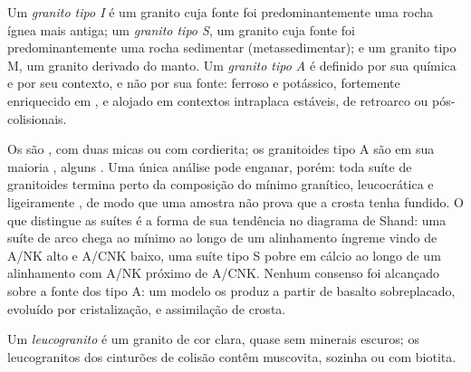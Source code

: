 \begin{definition}\label{def:b2:crustal-melting:types}
Um \emph{granito tipo I} é um granito cuja fonte foi predominantemente uma
rocha ígnea mais antiga; um \emph{granito tipo S}, um granito cuja fonte foi
predominantemente uma rocha sedimentar (metassedimentar); e um granito tipo M, um granito derivado
do manto. Um \emph{granito tipo A} é definido por sua química e por seu
contexto, e não por sua fonte: ferroso e potássico, fortemente enriquecido em ,
e alojado em contextos intraplaca estáveis, de retroarco ou pós-colisionais.
\end{definition}

Os  são , com duas micas ou com cordierita; os granitoides tipo A
são em sua maioria , alguns . Uma única análise pode enganar, porém: toda
suíte de granitoides termina perto da composição do mínimo granítico, leucocrática e ligeiramente
, de modo que uma amostra  não prova que a crosta tenha fundido. O que distingue
as suítes é a forma de sua tendência no diagrama de Shand: uma suíte de arco chega ao
mínimo ao longo de um alinhamento íngreme vindo de A/NK alto e A/CNK baixo, uma suíte tipo S pobre em cálcio
ao longo de um alinhamento com A/NK próximo de A/CNK. Nenhum consenso foi alcançado sobre a fonte dos
 tipo A: um modelo os produz a partir de basalto sobreplacado, evoluído por cristalização,
 e assimilação de crosta.

\begin{definition}[Leucogranito]\label{def:b2:crustal-melting:leucogranite}
Um \emph{leucogranito} é um granito de cor clara, quase sem
minerais escuros; os leucogranitos  dos cinturões de colisão contêm muscovita, sozinha ou
com biotita.
\end{definition}

